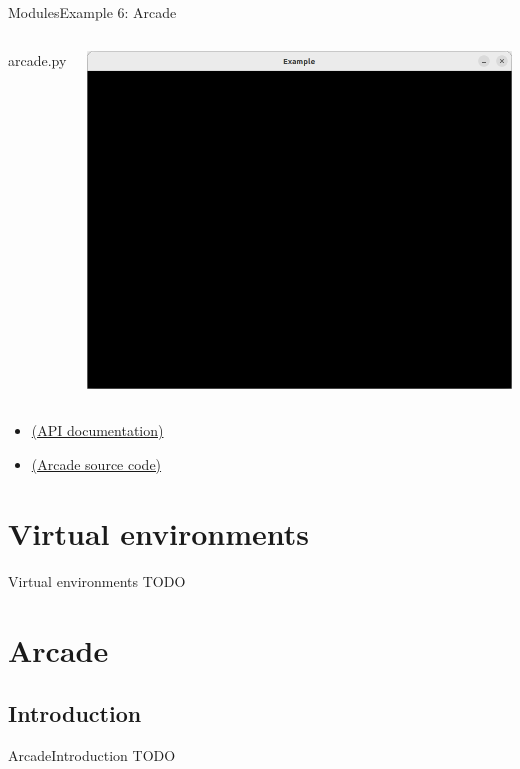 \documentclass[10pt,compress]{beamer} %
\begin{document}
\begin{frame}{Modules}{Example 6: Arcade}
	\begin{columns}

		\vspace{-0.2cm}
		\begin{exampleblock}{arcade.py}
		\vspace{-0.2cm}
		
		\vspace{-0.2cm}
		\end{exampleblock}

		\vspace{-0.2cm}
		\centering \includegraphics[width=\linewidth]{figs/window.png}\\
		\vspace{-0.2cm}
	\end{columns}

	\begin{itemize}
		\item \href{https://api.arcade.academy/en/latest/arcade.html}{(API documentation)}
		\item \href{https://github.com/pythonarcade/arcade/tree/development}{(Arcade source code)}
	\end{itemize}
\end{frame}

\section{Virtual environments}

\begin{frame}{Virtual environments}
	TODO
\end{frame}

\section{Arcade}
\subsection{Introduction}

\begin{frame}{Arcade}{Introduction}
	TODO
\end{frame}
\end{document}

